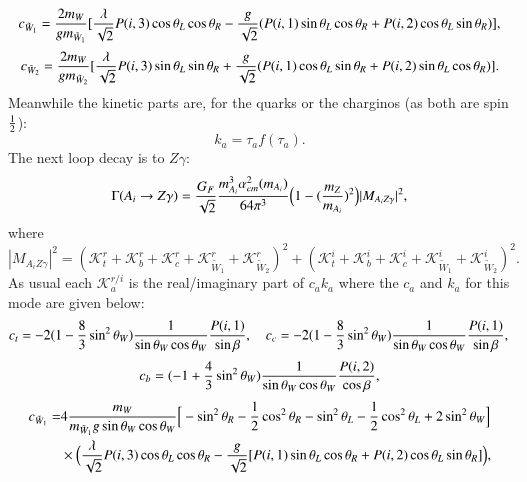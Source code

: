 \documentclass[final,3p,times]{elsarticle}
\begin{document}
\begin{equation}
c_{\tilde{W}_1} = {2 m_{W} \over g m_{\tilde{W}_1}} [{\lambda \over \sqrt{2}} P(i,3) \cos\theta_L \cos\theta_R - {g \over \sqrt{2}}(P(i,1)\sin\theta_L \cos\theta_R + P(i,2) \cos\theta_L \sin\theta_R)],
\end{equation}
\begin{equation}
c_{\tilde{W}_2} = {2 m_{W} \over g m_{\tilde{W}_2}} [{\lambda \over \sqrt{2}} P(i,3) \sin\theta_L \sin\theta_R + {g \over \sqrt{2}}(P(i,1)\cos\theta_L \sin\theta_R + P(i,2) \sin\theta_L \cos\theta_R)].
\end{equation}
Meanwhile the kinetic parts are, for the quarks or the charginos (as both are spin ${1 \over 2}$):
\begin{equation}
k_{a} = \tau_{a}f({\tau_{a}}).
\end{equation}
The next loop decay is to $Z\gamma$:
\begin{equation} \label{AZgamNMSSM}
\Gamma(A_i \rightarrow Z \gamma) = {G_{F} \over \sqrt{2}} {m_{A_i}^3 \alpha_{em}^2(m_{A_i}) \over 64 \pi^3} \Big(1 - ({m_{Z} \over m_{A_i}})^2 \Big) |M_{A_i Z \gamma}|^2,
\end{equation}
where
\begin{equation}
|M_{A_i Z \gamma}|^2 = (\mathcal{K}_{t}^{r} + \mathcal{K}_{b}^{r} +  \mathcal{K}_{c}^{r} +  \mathcal{K}_{\tilde{W}_1}^{r} + \mathcal{K}_{\tilde{W}_2}^{r})^2 + (\mathcal{K}_{t}^{i} + \mathcal{K}_{b}^{i} +  \mathcal{K}_{c}^{i} +  \mathcal{K}_{\tilde{W}_1}^{i} + \mathcal{K}_{\tilde{W}_2}^{i})^2.
\end{equation}
As usual each $\mathcal{K}_{a}^{r/i}$ is the real/imaginary part of $c_{a}k_{a}$ where the $c_{a}$ and $k_{a}$ for this mode are given below:
\begin{equation}
c_{t} = -2(1-{8 \over 3}\sin^2 \theta_W){1 \over \sin\theta_W \cos\theta_W}{P(i,1) \over \sin\beta}, \quad \quad \\
c_{c} = -2(1-{8 \over 3}\sin^2 \theta_W){1 \over \sin\theta_W \cos\theta_W}{P(i,1) \over \sin\beta}, \\
\end{equation}
\begin{equation}
c_{b} = (-1+{4 \over 3}\sin^2 \theta_W){1 \over \sin\theta_W \cos\theta_W}{P(i,2) \over \cos\beta} ,
\end{equation}
\begin{equation}
\begin{aligned}
c_{\tilde{W}_1} = & 4{m_{W} \over m_{\tilde{W}_1} g \sin\theta_W \cos\theta_W}\Big[-\sin^2 \theta_R - {1 \over 2}\cos^2 \theta_R - \sin^2 \theta_L - {1 \over 2}\cos^2 \theta_L + 2\sin^2 \theta_W\Big] \\ & \times \Big({\lambda \over \sqrt{2}}P(i,3)\cos\theta_L \cos\theta_R - {g \over \sqrt{2}}[P(i,1)\sin\theta_L \cos\theta_R + P(i,2)\cos\theta_L \sin\theta_R]\Big),
\end{aligned}
\end{equation}
\end{document}
